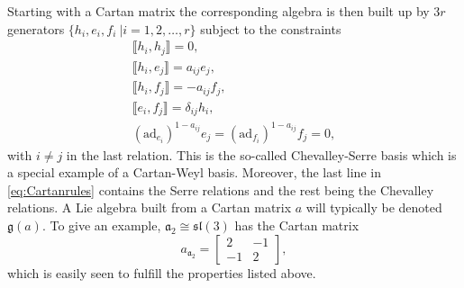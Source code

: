 Starting with a Cartan matrix the corresponding algebra is then built up by $3r$ generators $\{h_i,e_i,f_i\ |i=1,2,\ldots,r\}$ subject to the constraints
\begin{equation}
\begin{aligned}\label{eq:Cartanrules}
    \llbracket h_i,h_j\rrbracket = 0,\\
    \llbracket h_i,e_j\rrbracket = a_{ij}e_{j},\\
    \llbracket h_i,f_j\rrbracket = -a_{ij}f_{j},\\
    \llbracket e_i,f_j\rrbracket = \delta_{ij}h_i,\\
    (\text{ad}_{e_i})^{1-a_{ij}}e_j = (\text{ad}_{f_i})^{1-a_{ij}}f_j = 0,
\end{aligned}
\end{equation}
with $i\neq j$ in the last relation. This is the so-called Chevalley-Serre basis which is a special example of a Cartan-Weyl basis. Moreover, the last line in \eqref{eq:Cartanrules} contains the Serre relations and the rest being the Chevalley relations. A Lie algebra built from a Cartan matrix $a$ will typically be denoted $\mathfrak{g}(a)$. To give an example, $\mathfrak{a}_2\cong \mathfrak{sl}(3)$ has the Cartan matrix
\begin{equation}
    a_\mathfrak{a_2}=\begin{bmatrix}2&-1\\-1&2\end{bmatrix},
\end{equation}
which is easily seen to fulfill the properties listed above. 

